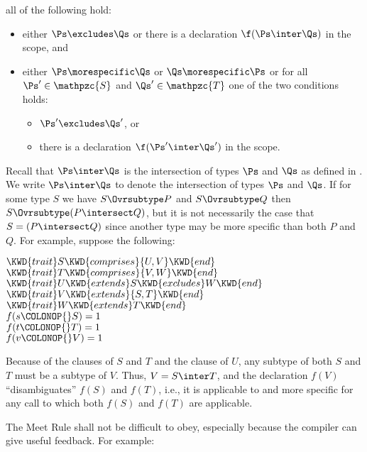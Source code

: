 all of the following hold:
\begin{itemize}
\item
either $\Ps \excludes \Qs$ or there is a declaration $\f(\Ps \inter
\Qs)$ in the scope,
and
\item
either $\Ps \morespecific \Qs$ or $\Qs \morespecific \Ps$ or for all
$\Ps' \in \mathpzc{S}$ and $\Qs' \in \mathpzc{T}$ one of the two
conditions holds:
\begin{itemize}
\item
$\Ps' \excludes \Qs'$, or
\item
there is a declaration $\f(\Ps' \inter \Qs')$ in the scope.
\end{itemize}
\end{itemize}

Recall that $\Ps \inter \Qs$ is the intersection of types $\Ps$ and $\Qs$
as defined in .
We write $\Ps \inter \Qs$ to denote the intersection of types $\Ps$ and $\Qs$.
If for some type $S$ we have $S \Ovrsubtype P$ and $S \Ovrsubtype Q$ then
$S \Ovrsubtype (P \intersect Q)$, but it is not necessarily the
case that $S = (P \intersect Q)$ since another type may be more
specific than both $P$ and $Q$.
\label{adv-over-comprises}
For example, suppose the following:
%
\begin{Fortress}
\(\KWD{trait} S \KWD{comprises} \{U,V\} \KWD{end}\)\\
\(\KWD{trait} T \KWD{comprises} \{V,W\} \KWD{end}\)\\
\(\KWD{trait} U \KWD{extends} S \KWD{excludes} W \KWD{end}\)\\
\(\KWD{trait} V \KWD{extends} \{S,T\} \KWD{end}\)\\
\(\KWD{trait} W \KWD{extends} T \KWD{end}\)\\[4pt]
\(f(s\COLONOP{}S) = 1\)\\
\(f(t\COLONOP{}T) = 1\)\\
\(f(v\COLONOP{}V) = 1\)
\end{Fortress}
Because of the  clauses of $S$ and $T$ and the 
clause of $U$, any subtype of both $S$ and $T$ must be a subtype of
$V$.  Thus, $V = S \inter T$, and the declaration $f(V)$
``disambiguates'' $f(S)$ and $f(T)$, i.e., it is applicable to and more
specific for any call to which both $f(S)$ and $f(T)$ are applicable.

The Meet Rule shall not be difficult to obey, especially because
the compiler can give useful feedback.  For example:

